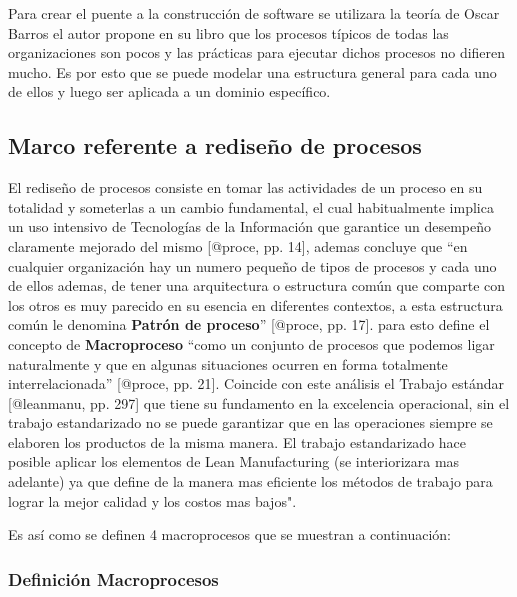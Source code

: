 \documentclass[11pt]{article}
\begin{document}
Para crear el puente a la construcción de software se utilizara la
teoría de Oscar Barros el autor propone en su libro que los procesos
típicos de todas las organizaciones son pocos y las prácticas para
ejecutar dichos procesos no difieren mucho. Es por esto que se puede
modelar una estructura general para cada uno de ellos y luego ser
aplicada a un dominio específico.

\hypertarget{marco-referente-a-rediseuxf1o-de-procesos}{%
\subsection{Marco referente a rediseño de
procesos}\label{marco-referente-a-rediseuxf1o-de-procesos}}

El rediseño de procesos consiste en tomar las actividades de un proceso
en su totalidad y someterlas a un cambio fundamental, el cual
habitualmente implica un uso intensivo de Tecnologías de la Información
que garantice un desempeño claramente mejorado del mismo {[}@proce, pp.
14{]}, ademas concluye que ``en cualquier organización hay un numero
pequeño de tipos de procesos y cada uno de ellos ademas, de tener una
arquitectura o estructura común que comparte con los otros es muy
parecido en su esencia en diferentes contextos, a esta estructura común
le denomina \textbf{Patrón de proceso}'' {[}@proce, pp. 17{]}. para esto
define el concepto de \textbf{Macroproceso} ``como un conjunto de
procesos que podemos ligar naturalmente y que en algunas situaciones
ocurren en forma totalmente interrelacionada'' {[}@proce, pp. 21{]}.
Coincide con este análisis el Trabajo estándar {[}@leanmanu, pp. 297{]}
que tiene su fundamento en la excelencia operacional, sin el trabajo
estandarizado no se puede garantizar que en las operaciones siempre se
elaboren los productos de la misma manera. El trabajo estandarizado hace
posible aplicar los elementos de Lean Manufacturing (se interiorizara
mas adelante) ya que define de la manera mas eficiente los métodos de
trabajo para lograr la mejor calidad y los costos mas bajos".

Es así como se definen 4 macroprocesos que se muestran a continuación:

\hypertarget{definiciuxf3n-macroprocesos}{%
\subsubsection{Definición
Macroprocesos}\label{definiciuxf3n-macroprocesos}}
\end{document}
